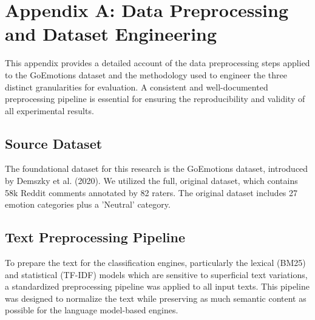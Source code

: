 
\chapter{Appendix A: Data Preprocessing and Dataset Engineering}
\label{app:preprocessing}

This appendix provides a detailed account of the data preprocessing steps applied to the GoEmotions dataset and the methodology used to engineer the three distinct granularities for evaluation. A consistent and well-documented preprocessing pipeline is essential for ensuring the reproducibility and validity of all experimental results.

\section{Source Dataset}

The foundational dataset for this research is the GoEmotions dataset, introduced by Demszky et al. (2020). We utilized the full, original dataset, which contains 58k Reddit comments annotated by 82 raters. The original dataset includes 27 emotion categories plus a 'Neutral' category.

\section{Text Preprocessing Pipeline}

To prepare the text for the classification engines, particularly the lexical (BM25) and statistical (TF-IDF) models which are sensitive to superficial text variations, a standardized preprocessing pipeline was applied to all input texts. This pipeline was designed to normalize the text while preserving as much semantic content as possible for the language model-based engines.

